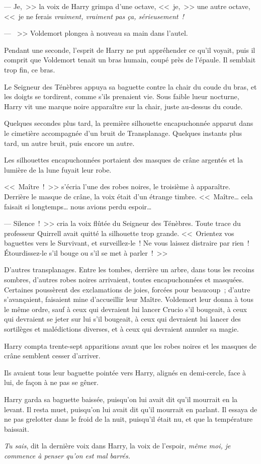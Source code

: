 --- Je,~>> la voix de Harry grimpa d'une octave, <<~je,~>> une autre octave, <<~je ne ferais \emph{vraiment, vraiment pas ça, sérieusement~!}

--- ~>> Voldemort plongea à nouveau sa main dans l'autel.

Pendant une seconde, l'esprit de Harry ne put appréhender ce qu'il voyait, puis il comprit que Voldemort tenait un bras humain, coupé près de l'épaule. Il semblait trop fin, ce bras.

Le Seigneur des Ténèbres appuya sa baguette contre la chair du coude du bras, et les doigts se tordirent, comme s'ils prenaient vie. Sous faible lueur nocturne, Harry vit une marque noire apparaître sur la chair, juste au-dessus du coude.

Quelques secondes plus tard, la première silhouette encapuchonnée apparut dans le cimetière accompagnée d'un bruit de Transplanage. Quelques instants plus tard, un autre bruit, puis encore un autre.

Les silhouettes encapuchonnées portaient des masques de crâne argentés et la lumière de la lune fuyait leur robe.

<<~Maître~!~>> s'écria l'une des robes noires, le troisième à apparaître. Derrière le masque de crâne, la voix était d'un étrange timbre. <<~Maître… cela faisait si longtemps… nous avions perdu espoir…

--- Silence~!~>> cria la voix flûtée du Seigneur des Ténèbres. Toute trace du professeur Quirrell avait quitté la silhouette trop grande. <<~Orientez vos baguettes vers le Survivant, et surveillez-le~! Ne vous laissez distraire par rien~! Étourdissez-le s'il bouge ou s'il se met à parler~!~>>

D'autres transplanages. Entre les tombes, derrière un arbre, dans tous les recoins sombres, d'autres robes noires arrivaient, toutes encapuchonnées et masquées. Certaines poussèrent des exclamations de joies, forcées pour beaucoup~; d'autre s'avançaient, faisaient mine d'accueillir leur Maître. Voldemort leur donna à tous le même ordre, sauf à ceux qui devraient lui lancer Crucio s'il bougeait, à ceux qui devraient se jeter sur lui s'il bougeait, à ceux qui devraient lui lancer des sortilèges et malédictions diverses, et à ceux qui devraient annuler sa magie.

Harry compta trente-sept apparitions avant que les robes noires et les masques de crâne semblent cesser d'arriver.

Ils avaient tous leur baguette pointée vers Harry, alignés en demi-cercle, face à lui, de façon à ne pas se gêner.

Harry garda sa baguette baissée, puisqu'on lui avait dit qu'il mourrait en la levant. Il resta muet, puisqu'on lui avait dit qu'il mourrait en parlant. Il essaya de ne pas grelotter dans le froid de la nuit, puisqu'il était nu, et que la température baissait.

\emph{Tu sais}, dit la dernière voix dans Harry, la voix de l'espoir, \emph{même moi, je commence à penser qu'on est mal barrés.}
